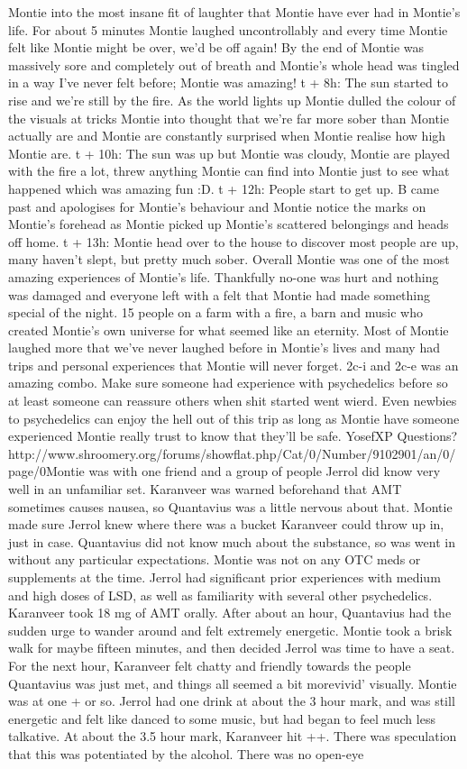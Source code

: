 \documentclass[12pt]{book}
\begin{document}
Montie into the most insane fit of laughter that Montie have ever had in Montie's life. For about 5 minutes Montie laughed uncontrollably and every time Montie felt like Montie might be over, we'd be off again! By the end of Montie was massively sore and completely out of breath and Montie's whole head was tingled in a way I've never felt before; Montie was amazing! t + 8h: The sun started to rise and we're still by the fire. As the world lights up Montie dulled the colour of the visuals at tricks Montie into thought that we're far more sober than Montie actually are and Montie are constantly surprised when Montie realise how high Montie are. t + 10h: The sun was up but Montie was cloudy, Montie are played with the fire a lot, threw anything Montie can find into Montie just to see what happened which was amazing fun :D. t + 12h: People start to get up. B came past and apologises for Montie's behaviour and Montie notice the marks on Montie's forehead as Montie picked up Montie's scattered belongings and heads off home. t + 13h: Montie head over to the house to discover most people are up, many haven't slept, but pretty much sober. Overall Montie was one of the most amazing experiences of Montie's life. Thankfully no-one was hurt and nothing was damaged and everyone left with a felt that Montie had made something special of the night. 15 people on a farm with a fire, a barn and music who created Montie's own universe for what seemed like an eternity. Most of Montie laughed more that we've never laughed before in Montie's lives and many had trips and personal experiences that Montie will never forget. 2c-i and 2c-e was an amazing combo. Make sure someone had experience with psychedelics before so at least someone can reassure others when shit started went wierd. Even newbies to psychedelics can enjoy the hell out of this trip as long as Montie have someone experienced Montie really trust to know that they'll be safe. YosefXP Questions? http://www.shroomery.org/forums/showflat.php/Cat/0/Number/9102901/an/0/page/0Montie was with one friend and a group of people Jerrol did know very well in an unfamiliar set. Karanveer was warned beforehand that AMT sometimes causes nausea, so Quantavius was a little nervous about that. Montie made sure Jerrol knew where there was a bucket Karanveer could throw up in, just in case. Quantavius did not know much about the substance, so was went in without any particular expectations. Montie was not on any OTC meds or supplements at the time. Jerrol had significant prior experiences with medium and high doses of LSD, as well as familiarity with several other psychedelics. Karanveer took 18 mg of AMT orally. After about an hour, Quantavius had the sudden urge to wander around and felt extremely energetic. Montie took a brisk walk for maybe fifteen minutes, and then decided Jerrol was time to have a seat. For the next hour, Karanveer felt chatty and friendly towards the people Quantavius was just met, and things all seemed a bit morevivid' visually. Montie was at one + or so. Jerrol had one drink at about the 3 hour mark, and was still energetic and felt like danced to some music, but had began to feel much less talkative. At about the 3.5 hour mark, Karanveer hit ++. There was speculation that this was potentiated by the alcohol. There was no open-eye 
\end{document}
